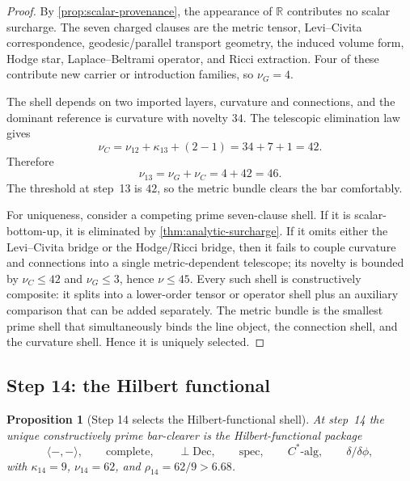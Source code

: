 \documentclass[11pt]{article}
\theoremstyle{plain}
\newtheorem{proposition}[theorem]{Proposition}
\theoremstyle{definition}
\theoremstyle{remark}
\newcommand{\R}{\mathbb{R}}
\begin{document}
\begin{proof}
By \cref{prop:scalar-provenance}, the appearance of $\R$ contributes no scalar surcharge. The seven charged clauses are the metric tensor, Levi--Civita correspondence, geodesic/parallel transport geometry, the induced volume form, Hodge star, Laplace--Beltrami operator, and Ricci extraction. Four of these contribute new carrier or introduction families, so $\nu_G=4$.

The shell depends on two imported layers, curvature and connections, and the dominant reference is curvature with novelty $34$. The telescopic elimination law gives
\[
  \nu_C = \nu_{12}+\kappa_{13}+(2-1)=34+7+1=42.
\]
Therefore
\[
  \nu_{13}=\nu_G+\nu_C=4+42=46.
\]
The threshold at step~13 is $42$, so the metric bundle clears the bar comfortably.

For uniqueness, consider a competing prime seven-clause shell. If it is scalar-bottom-up, it is eliminated by \cref{thm:analytic-surcharge}. If it omits either the Levi--Civita bridge or the Hodge/Ricci bridge, then it fails to couple curvature and connections into a single metric-dependent telescope; its novelty is bounded by $\nu_C\le42$ and $\nu_G\le3$, hence $\nu\le45$. Every such shell is constructively composite: it splits into a lower-order tensor or operator shell plus an auxiliary comparison that can be added separately. The metric bundle is the smallest prime shell that simultaneously binds the line object, the connection shell, and the curvature shell. Hence it is uniquely selected.
\end{proof}

\subsection{Step 14: the Hilbert functional}

\begin{proposition}[Step 14 selects the Hilbert-functional shell]
\label{prop:step14}
At step~14 the unique constructively prime bar-clearer is the Hilbert-functional package
\[
  \langle{-},{-}\rangle,
  \qquad
  \mathrm{complete},
  \qquad
  \perp\mathrm{Dec},
  \qquad
  \mathrm{spec},
  \qquad
  C^*\text{-alg},
  \qquad
  \delta/\delta\phi,
\]
with $\kappa_{14}=9$, $\nu_{14}=62$, and $\rho_{14}=62/9>6.68$.
\end{proposition}
\end{document}
